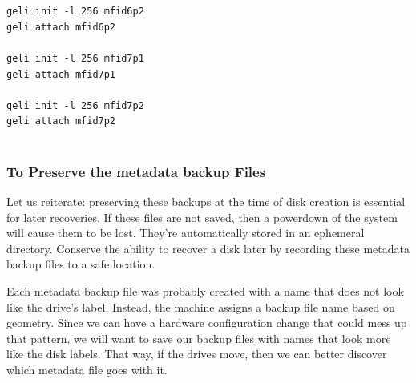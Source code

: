 \texttt{geli init -l 256 mfid6p2}\\
\texttt{geli attach mfid6p2}\\\\
\texttt{geli init -l 256 mfid7p1}\\
\texttt{geli attach mfid7p1}\\\\
\texttt{geli init -l 256 mfid7p2}\\
\texttt{geli attach mfid7p2}\\\\

\subsubsection{To Preserve the  \Gls{metadata} \gls{backup} Files}
Let us reiterate:  preserving these backups at the time of disk creation is essential for later recoveries.  If these files are not saved, then a powerdown of the system will cause them to be lost.  They're automatically stored in an ephemeral directory.  Conserve the ability to recover a disk later by recording these  \gls{metadata} \gls{backup} files to a safe location.

Each  \gls{metadata} \gls{backup} file was probably created with a name that does not look like the drive’s label.  Instead, the machine assigns a \gls{backup} file name based on geometry.  Since we can have a hardware \gls{configuration} change that could mess up that pattern, we will want to save our \gls{backup} files with names that look more like the disk labels.  That way, if the drives move, then we can better discover which  \gls{metadata} file goes with it.\\

